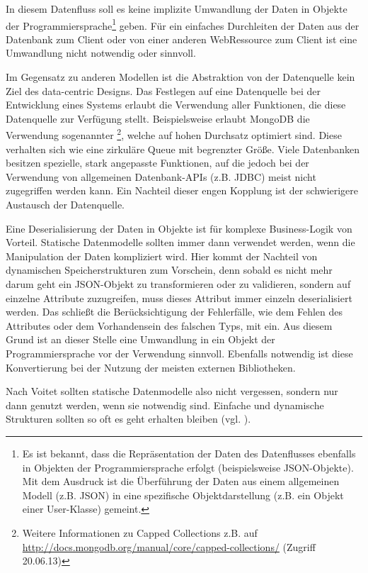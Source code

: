 In diesem Datenfluss soll es keine implizite Umwandlung der Daten in Objekte der Programmiersprache\footnote{Es ist bekannt, dass die Repräsentation der Daten des Datenflusses ebenfalls in Objekten der Programmiersprache erfolgt (beispielsweise JSON-Objekte). Mit dem Ausdruck ist die Überführung der Daten aus einem allgemeinen Modell (z.B. JSON) in eine spezifische Objektdarstellung (z.B. ein Objekt einer User-Klasse) gemeint.} geben. Für ein einfaches Durchleiten der Daten aus der Datenbank zum Client oder von einer anderen Web\gls{Ressource} zum Client ist eine Umwandlung nicht notwendig oder sinnvoll. 

Im Gegensatz zu anderen Modellen ist die Abstraktion von der Datenquelle kein Ziel des data-centric Designs. Das Festlegen auf eine Datenquelle bei der Entwicklung eines Systems erlaubt die Verwendung aller Funktionen, die diese Datenquelle zur Verfügung stellt. Beispielsweise erlaubt MongoDB die Verwendung sogenannter \footnote{Weitere Informationen zu Capped Collections z.B. auf \url{http://docs.mongodb.org/manual/core/capped-collections/} (Zugriff 20.06.13)}, welche auf hohen Durchsatz optimiert sind. Diese verhalten sich wie eine zirkuläre Queue mit begrenzter Größe. Viele Datenbanken besitzen spezielle, stark angepasste Funktionen, auf die jedoch bei der Verwendung von allgemeinen Datenbank-APIs (z.B. JDBC) meist nicht zugegriffen werden kann. Ein Nachteil dieser engen Kopplung ist der schwierigere Austausch der Datenquelle. 

Eine Deserialisierung der Daten in Objekte ist für komplexe \gls{Business-Logik} von Vorteil. Statische Datenmodelle sollten immer dann verwendet werden, wenn die Manipulation der Daten kompliziert wird. Hier kommt der Nachteil von dynamischen Speicherstrukturen zum Vorschein, denn sobald es nicht mehr darum geht ein JSON-Objekt zu transformieren oder zu validieren, sondern auf einzelne Attribute zuzugreifen, muss dieses Attribut immer einzeln deserialisiert werden. Das schließt die Berücksichtigung der Fehlerfälle, wie dem Fehlen des Attributes oder dem Vorhandensein des falschen Typs, mit ein. Aus diesem Grund ist an dieser Stelle eine Umwandlung in ein Objekt der Programmiersprache vor der Verwendung sinnvoll. Ebenfalls notwendig ist diese Konvertierung bei der Nutzung der meisten externen Bibliotheken.

Nach Voitet sollten statische Datenmodelle also nicht vergessen, sondern nur dann genutzt werden, wenn sie notwendig sind. Einfache und dynamische Strukturen sollten so oft es geht erhalten bleiben (vgl. \cite{jctc}).

